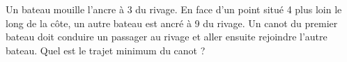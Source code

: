 \begin{exercice}\label{exo0016}

Un bateau mouille l'ancre à \unit{3}{\kilo\meter} du rivage. En face d'un point situé \unit{4}{\kilo\meter} plus loin le long de la côte, un autre bateau est ancré à \unit{9}{\kilo\meter} du rivage. Un canot du premier bateau doit conduire un passager au rivage et aller ensuite rejoindre l'autre bateau. Quel est le trajet minimum du canot ?

\end{exercice}

